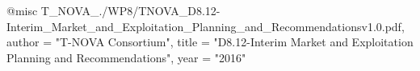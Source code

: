 @misc{ T_NOVA_./WP8/TNOVA_D8.12-Interim_Market_and_Exploitation_Planning_and_Recommendationsv1.0.pdf,
       author = "{T-NOVA Consortium}",
       title = "D8.12-Interim Market and Exploitation Planning and Recommendations",
       year = "2016" }
